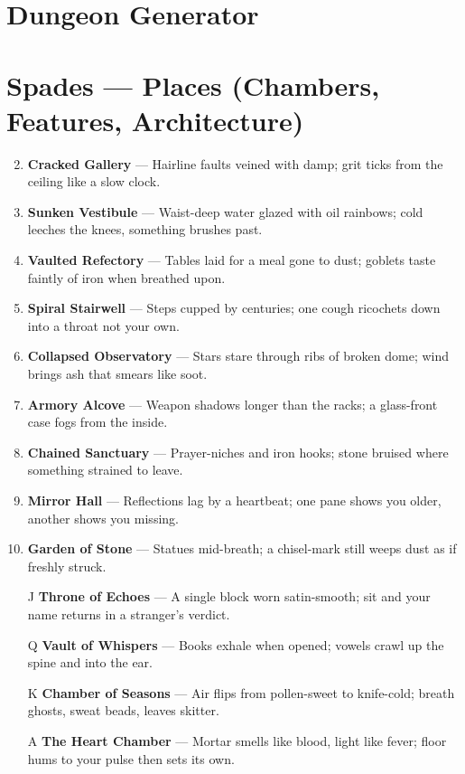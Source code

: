 \section{Dungeon Generator}
\label{chap:dungeon-generator}

\section*{Spades --- Places (Chambers, Features, Architecture)}
\label{sec:dungeon-places}
\begin{enumerate}
\setcounter{enumi}{1}
\item \textbf{Cracked Gallery} — Hairline faults veined with damp; grit ticks from the ceiling like a slow clock.
\item \textbf{Sunken Vestibule} — Waist-deep water glazed with oil rainbows; cold leeches the knees, something brushes past.
\item \textbf{Vaulted Refectory} — Tables laid for a meal gone to dust; goblets taste faintly of iron when breathed upon.
\item \textbf{Spiral Stairwell} — Steps cupped by centuries; one cough ricochets down into a throat not your own.
\item \textbf{Collapsed Observatory} — Stars stare through ribs of broken dome; wind brings ash that smears like soot.
\item \textbf{Armory Alcove} — Weapon shadows longer than the racks; a glass-front case fogs from the inside.
\item \textbf{Chained Sanctuary} — Prayer-niches and iron hooks; stone bruised where something strained to leave.
\item \textbf{Mirror Hall} — Reflections lag by a heartbeat; one pane shows you older, another shows you missing.
\item \textbf{Garden of Stone} — Statues mid-breath; a chisel-mark still weeps dust as if freshly struck.
\item[J] \textbf{Throne of Echoes} — A single block worn satin-smooth; sit and your name returns in a stranger’s verdict.
\item[Q] \textbf{Vault of Whispers} — Books exhale when opened; vowels crawl up the spine and into the ear.
\item[K] \textbf{Chamber of Seasons} — Air flips from pollen-sweet to knife-cold; breath ghosts, sweat beads, leaves skitter.
\item[A] \textbf{The Heart Chamber} — Mortar smells like blood, light like fever; floor hums to your pulse then sets its own.
\end{enumerate}

